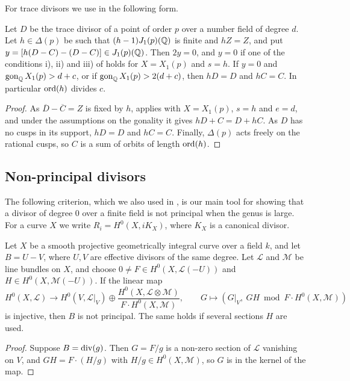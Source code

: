 For trace divisors we use  in the following form.

\begin{lemma}\label{lem:stab}
Let $D$ be the trace divisor of a point of order $p$ over a number field of degree $d$. Let $h\in\Delta(p)$ be such that $(h-1)J_1(p)(\mathbb{Q})$ is finite and $hZ=Z$, and put $y=[h(D-C)-(D-C)]\in J_1(p)(\mathbb{Q})$. Then $2y=0$, and $y=0$ if one of the conditions i), ii) and iii) of  holds for $X=X_1(p)$ and $s=h$. If $y=0$ and $\operatorname{gon}_{\mathbb{Q}} X_1(p)>d+c$, or if $\operatorname{gon}_{\mathbb{Q}} X_1(p)>2(d+c)$, then $hD=D$ and $hC=C$. In particular $\operatorname{ord}(h)$ divides $c$.
\end{lemma}

\begin{proof}
As $\overline D-\overline C=Z$ is fixed by $h$,  applies with $X=X_1(p)$, $s=h$ and $e=d$, and under the assumptions on the gonality it gives $hD+C=D+hC$. As $D$ has no cusps in its support, $hD=D$ and $hC=C$. Finally, $\Delta(p)$ acts freely on the rational cusps, so $C$ is a sum of orbits of length $\operatorname{ord}(h)$.
\end{proof}

\subsection{Non-principal divisors}
The following criterion, which we also used in \cite{N69}, is our main tool for showing that a divisor of degree $0$ over a finite field is not principal when the genus is large. For a curve $X$ we write $R_i=H^0(X,iK_X)$, where $K_X$ is a canonical divisor.

\begin{lemma}\label{lem:mult}
Let $X$ be a smooth projective geometrically integral curve over a field $k$, and let $B=U-V$, where $U,V$ are effective divisors of the same degree. Let $\mathcal L$ and $\mathcal M$ be line bundles on $X$, and choose $0\neq F\in H^0(X,\mathcal L(-U))$ and $H\in H^0(X,\mathcal M(-U))$. If the linear map
$$H^0(X,\mathcal L)\longrightarrow H^0(V,\mathcal L|_V)\oplus\frac{H^0(X,\mathcal L\otimes\mathcal M)}{F\cdot H^0(X,\mathcal M)},\qquad G\longmapsto(G|_V,\ GH\bmod F\cdot H^0(X,\mathcal M))$$
is injective, then $B$ is not principal. The same holds if several sections $H$ are used.
\end{lemma}

\begin{proof}
Suppose $B=\operatorname{div}(g)$. Then $G=F/g$ is a non-zero section of $\mathcal L$ vanishing on $V$, and $GH=F\cdot(H/g)$ with $H/g\in H^0(X,\mathcal M)$, so $G$ is in the kernel of the map.
\end{proof}

